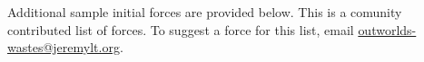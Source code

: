 Additional sample initial forces are provided below.
This is a comunity contributed list of forces.
To suggest a force for this list, email \href{mailto:outworlds-wastes@jeremylt.org}{outworlds-wastes@jeremylt.org}.











